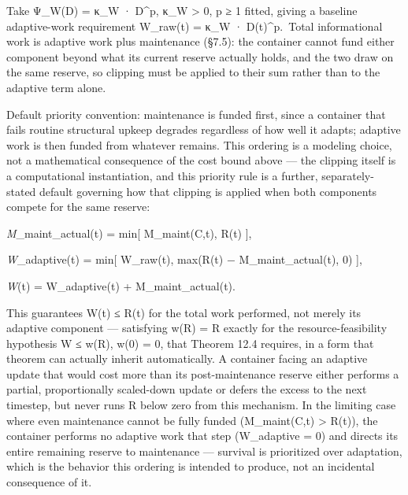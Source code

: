 \documentclass[
]{article}
\begin{document}
Take Ψ\_W(D) = κ\_W · D\^{}p, κ\_W \textgreater{} 0, p ≥ 1 fitted,
giving a baseline adaptive-work requirement W\_raw(t) = κ\_W ·
D(t)\^{}p.~Total informational work is adaptive work plus maintenance
(§7.5): the container cannot fund either component beyond what its
current reserve actually holds, and the two draw on the same reserve, so
clipping must be applied to their sum rather than to the adaptive term
alone.

Default priority convention: maintenance is funded first, since a
container that fails routine structural upkeep degrades regardless of
how well it adapts; adaptive work is then funded from whatever remains.
This ordering is a modeling choice, not a mathematical consequence of
the cost bound above --- the clipping itself is a computational
instantiation, and this priority rule is a further, separately-stated
default governing how that clipping is applied when both components
compete for the same reserve:

\emph{M}\_maint\_actual(t) = min{[} M\_maint(C,t), R(t) {]},

\emph{W}\_adaptive(t) = min{[} W\_raw(t), max(R(t) −
M\_maint\_actual(t), 0) {]},

\emph{W}(t) = W\_adaptive(t) + M\_maint\_actual(t).

This guarantees W(t) ≤ R(t) for the total work performed, not merely its
adaptive component --- satisfying w(R) = R exactly for the
resource-feasibility hypothesis W ≤ w(R), w(0) = 0, that Theorem 12.4
requires, in a form that theorem can actually inherit automatically. A
container facing an adaptive update that would cost more than its
post-maintenance reserve either performs a partial, proportionally
scaled-down update or defers the excess to the next timestep, but never
runs R below zero from this mechanism. In the limiting case where even
maintenance cannot be fully funded (M\_maint(C,t) \textgreater{} R(t)),
the container performs no adaptive work that step (W\_adaptive = 0) and
directs its entire remaining reserve to maintenance --- survival is
prioritized over adaptation, which is the behavior this ordering is
intended to produce, not an incidental consequence of it.
\end{document}

